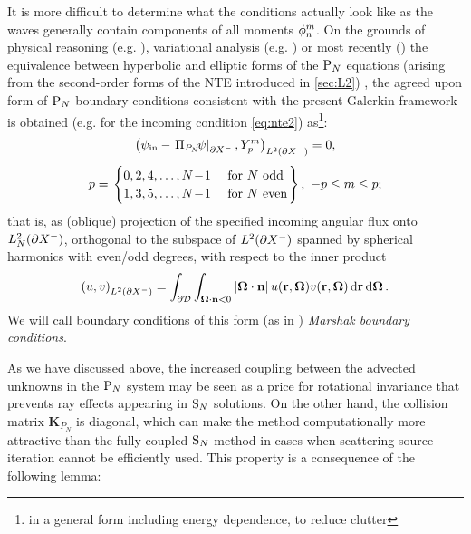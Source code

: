 It is more difficult to determine what the conditions actually look like as the
waves generally contain components of all moments $\angmom{n}{m}$. On the grounds of physical reasoning
(e.g. \cite{Rumyantsev}), variational analysis (e.g. \cite{Davis}) or most recently (\cite{Sanchez8}) the equivalence
between hyperbolic and elliptic forms of the $\PN$ equations (arising from the second-order forms of the NTE introduced
in \ref{sec:L2}) , the agreed upon form of $\PN$ boundary conditions consistent with the present Galerkin framework is
obtained (e.g. for the incoming condition \eqref{eq:nte2}) as\footnote{in a general form including energy dependence, to reduce clutter}:
$$
\begin{gathered}
	\left(\psi_\text{in} - \left.\Projop[P_N]\!\psi\right\vert_{\pX[-]}, \Y{p}{m} \right)_{\Lp[2](\pX[-])} = 0,\\[.35em] 
	p = 
	\left.\begin{cases}
		0,2,4,\ldots,N\!-\!1 & \mbox{ for $N$ odd}\\
		1,3,5,\ldots,N\!-\!1 & \mbox{ for $N$ even}	
	\end{cases}\right\},\ -p \leq m \leq p;
\end{gathered}
$$
that is, as (oblique) projection of the specified incoming angular flux onto $\Lp[2]_N(\pX[-])$, orthogonal
to the subspace of $\Lp[2](\pX[-])$ spanned by spherical harmonics with even/odd degrees, with respect to the inner
product
$$
	\left(u,v\right)_{\Lp[2](\pX[-])} = \int_{\pV}\int_{\bomega\cdot\bn < 0}\abs{\bomega\cdot\bn}
	u(\br,\bomega)v(\br,\bomega)\,\d{\br}\d{\bomega}.
$$
 We will call boundary conditions of this form (as in \cite{Davis}) \textit{Marshak boundary
conditions}.

As we have discussed above, the increased coupling between the advected
unknowns in the $\PN$ system may be seen as a price for rotational invariance
that prevents ray effects appearing in $\SN$ solutions. On the other hand, the collision matrix $\mathbf{K}_{P_N}$ is
diagonal, which can make the method computationally more attractive than the fully coupled $\SN$ method in cases when 
scattering source iteration cannot be efficiently used. This property is a consequence of the following lemma:

